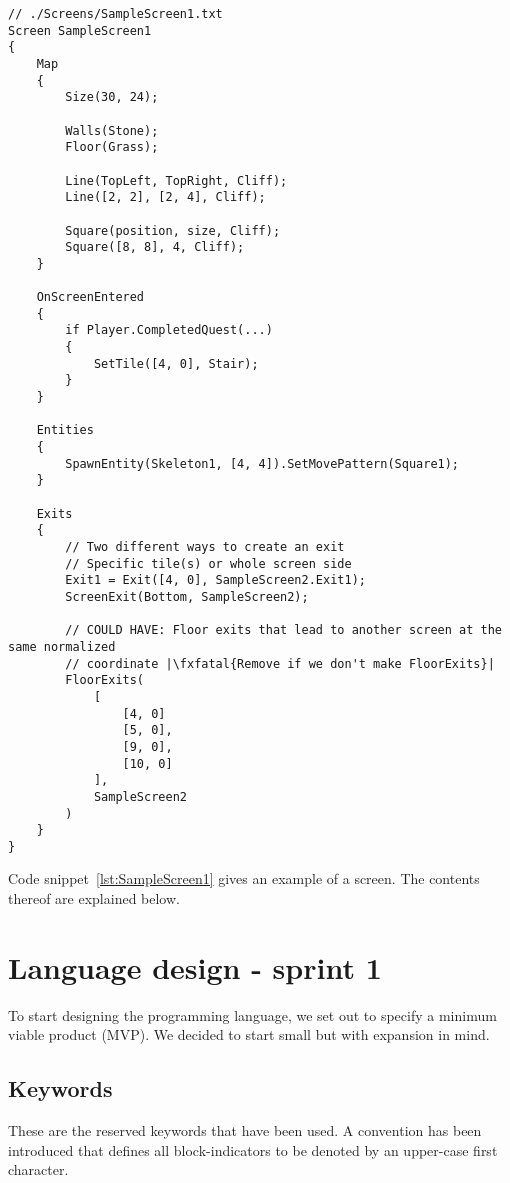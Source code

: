 \begin{lstlisting}[caption={Example screen}, label={lst:SampleScreen1},escapechar=|]
// ./Screens/SampleScreen1.txt
Screen SampleScreen1 
{
    Map 
    {
        Size(30, 24);

        Walls(Stone); 
        Floor(Grass);

        Line(TopLeft, TopRight, Cliff);
        Line([2, 2], [2, 4], Cliff);

        Square(position, size, Cliff);
        Square([8, 8], 4, Cliff);
    }

    OnScreenEntered
    {
        if Player.CompletedQuest(...) 
        {
            SetTile([4, 0], Stair);
        }
    }

    Entities
    {
        SpawnEntity(Skeleton1, [4, 4]).SetMovePattern(Square1);
    }
    
    Exits 
    {
        // Two different ways to create an exit
        // Specific tile(s) or whole screen side
        Exit1 = Exit([4, 0], SampleScreen2.Exit1);
        ScreenExit(Bottom, SampleScreen2);
    
        // COULD HAVE: Floor exits that lead to another screen at the same normalized 
        // coordinate |\fxfatal{Remove if we don't make FloorExits}|
        FloorExits(  
            [ 
                [4, 0] 
                [5, 0], 
                [9, 0], 
                [10, 0] 
            ],
            SampleScreen2
        )
    }
}
\end{lstlisting}

Code snippet~\ref{lst:SampleScreen1} gives an example of a screen. The contents thereof are explained below.

\section{Language design - sprint 1}

To start designing the programming language, we set out to specify a minimum viable product (MVP). We decided to start small but with expansion in mind.

\subsection{Keywords}
These are the reserved keywords that have been used.  A convention has been introduced that defines all block-indicators to be denoted by an upper-case first character.

